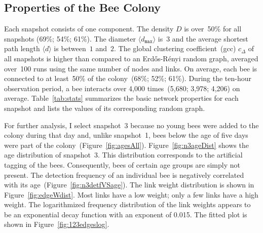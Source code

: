 \subsection{Properties of the Bee Colony}
\label{subsec:colony}
Each snapshot consists of one component.
The density $D$ is over~50\% for all snapshots (69\%; 54\%; 61\%).
The diameter $\langle d_{\texttt{max}} \rangle$ is~$3$ and the average shortest path length $\langle d \rangle$ is between~$1$ and~$2$.
The global clustering coefficient~(gcc) $c_\Delta$ of all snapshots is higher than compared to an Erd\H{o}s-R\'{e}nyi random graph, averaged over~100 runs using the same number of nodes and links.
On average, each bee is connected to at least~50\% of the colony~(68\%; 52\%; 61\%).
During the ten-hour observation period, a bee interacts over 4,000 times~(5,680; 3,978; 4,206) on average.
Table~\ref{tab:stats} summarizes the basic network properties for each snapshot and lists the values of its corresponding random graph.

For further analysis, I select snapshot~3 because no young bees were added to the colony during that day and, unlike snapshot~1, bees below the age of five days were part of the colony~(Figure~\ref{fig:agesAll}).
Figure~\ref{fig:n3ageDist} shows the age distribution of snapshot~3.
This distribution corresponds to the artificial tagging of the bees.
Consequently, bees of certain age groups are simply not present.
The detection frequency of an individual bee is negatively correlated with its age~(Figure~\ref{fig:n3detfVSage}).
The link weight distribution is shown in Figure~\ref{fig:edgeWdist}.
Most links have a low weight; only a few links have a high weight.
The logarithmized frequency distribution of the link weights appears to be an exponential decay function with an exponent of 0.015. The fitted plot is shown in Figure~\ref{fig:123edgeslog}.



